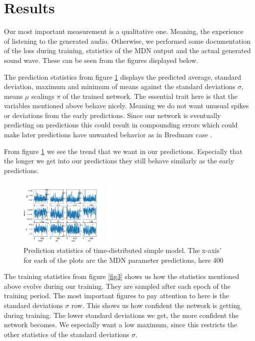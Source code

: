 \documentclass[conference]{IEEEtran}
\begin{document}
\section{Results}
Our most important measurement is a qualitative one. Meaning, the experience of listening to the generated audio. Otherwise, we performed some documentation of the loss during training, statistics of the MDN output and the actual generated sound wave. These can be seen from the figures displayed below. 

The prediction statistics from figure \ref{fig2} displays the predicted average, standard deviation, maximum and minimum of means against the standard deviations \boldmath$\sigma$, means $\mu$ scalings $\pi$ of the trained network. The essential trait here is that the variables mentioned above behave nicely. Meaning we do not want unusual spikes or deviations from the early predictions. Since our network is eventually predicting on predictions this could result in compounding errors which could make later predictions have unwanted behavior as in Bredmars case \cite{b2}. \unboldmath

From figure \ref{fig2} we see the trend that we want in our predictions. Especially that the longer we get into our predictions they still behave similarly as the early predictions.

\begin{figure}[ht] 
  \centering %
  \includegraphics[width=0.39\textwidth]{./best/BEST2_stats.png} 
  \caption{Prediction statistics of time-distributed simple model. The x-axis' for each of the plots are the MDN parameter predictions, here 400}
  \label{fig2} 
\end{figure}

The training statistics from figure \ref{fig3} shows us how the statistics mentioned above evolve during our training. They are sampled after each epoch of the training period. The most important figures to pay attention to here is the standard deviations \boldmath$\sigma$ row. This shows us how confident the network is getting during training. The lower standard deviations we get, the more confident the network becomes. We especially want a low maximum, since this restricts the other statistics of the standard deviations $\sigma$. \unboldmath
\end{document}
